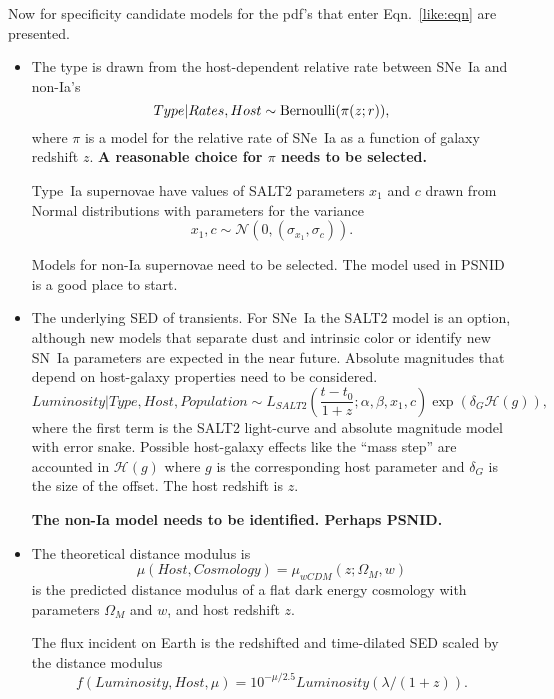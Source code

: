 \documentclass[preprint,3p]{elsarticle}
\begin{document}
Now for specificity candidate models for the pdf's that enter Eqn.~\ref{like:eqn}
are presented.
\begin{itemize}
\item The type is drawn from the host-dependent relative rate between SNe~Ia and non-Ia's 
\begin{equation}
Type | Rates, Host \sim {\rm Bernoulli}(\pi(z;r)),
\end{equation}
where $\pi$ is a model for the relative rate of SNe~Ia as a
function of galaxy redshift $z$.  {\bf A reasonable choice for $\pi$ needs to be
selected.}

Type~Ia supernovae have values of SALT2 parameters
$x_1$ and $c$ drawn from Normal distributions
with parameters for the variance
\begin{equation}
x_1, c \sim \mathcal{N}(0, (\sigma_{x_1}, \sigma_c)).
\end{equation}

Models for non-Ia supernovae need to be selected.  The model used in PSNID is a good
place to start.
\item The underlying SED of transients.  For SNe~Ia the SALT2 model
is an option, although new models that separate dust and intrinsic color or
identify new SN~Ia parameters are expected in the near future.  Absolute magnitudes
that depend on host-galaxy properties need to be considered. 
\begin{equation}
Luminosity| Type
, Host, Population \sim L_{SALT2}\left(\frac{t-t_0}{1+z}; \alpha, \beta, x_1, c\right) \exp{\left(\delta_G\mathcal{H}(g)\right)},
\end{equation}
where the first  term is the SALT2 light-curve and absolute magnitude
model with error snake.  Possible host-galaxy effects like the ``mass step'' are
accounted in $\mathcal{H}(g)$ where $g$ is the corresponding host parameter
and $\delta_G$ is the size of the offset.  The host redshift is $z$.

{\bf The non-Ia model needs to be identified.  Perhaps PSNID.}
\item The theoretical distance modulus is
\begin{equation}
\mu(Host, Cosmology) = \mu_{wCDM}(z; \Omega_M, w)
\end{equation}
is the predicted distance modulus of a flat dark energy cosmology
with parameters $\Omega_M$ and $w$, and host redshift $z$.

The flux incident on Earth is the redshifted and time-dilated SED scaled
by the distance modulus
\begin{equation}
f(Luminosity, Host, \mu) = 10^{-\mu/2.5} Luminosity(\lambda/(1+z)).
\end{equation}


\end{itemize}
\end{document}

